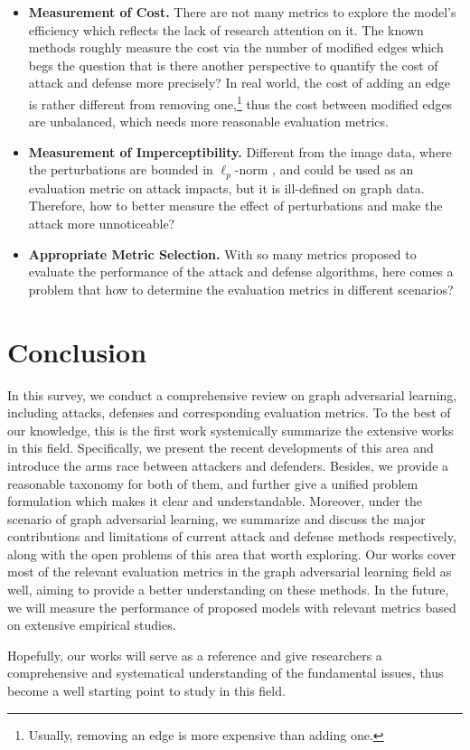 \begin{itemize}
	\item \textbf{Measurement of Cost.} There are not many metrics to explore the model's efficiency which reflects the lack of research attention on it. The known methods roughly measure the cost via the number of modified edges which begs the question that is there another perspective to quantify the cost of attack and defense more precisely? In real world, the cost of adding an edge is rather different from removing one,\footnote{Usually, removing an edge is more expensive than adding one.} thus the cost between modified edges are unbalanced, which needs more reasonable evaluation metrics.

	\item \textbf{Measurement of Imperceptibility.} Different from the image data, where the perturbations are bounded in $\ell_p$-norm \cite{sun2018adversarial,goodfellow2014explaining,madry2017towards}, and could be used as an evaluation metric on attack impacts, but it is ill-defined on graph data. Therefore, how to better measure the effect of perturbations and make the attack more unnoticeable?
	\item \textbf{Appropriate Metric Selection.} With so many metrics proposed to evaluate the performance of the attack and defense algorithms, here comes a problem that how to determine the evaluation metrics in different scenarios?
\end{itemize}


\section{Conclusion}
\label{conclusion}
In this survey, we conduct a comprehensive review on graph adversarial learning, including attacks, defenses and corresponding evaluation metrics. To the best of our knowledge, this is the first work systemically summarize the extensive works in this field. Specifically, we present the recent developments of this area and introduce the arms race between attackers and defenders. Besides, we provide a reasonable taxonomy for both of them, and further give a unified problem formulation which makes it clear and understandable. Moreover, under the scenario of graph adversarial learning, we summarize and discuss the major contributions and limitations of current attack and defense methods respectively, along with the open problems of this area that worth exploring. Our works cover most of the relevant evaluation metrics in the graph adversarial learning field as well, aiming to provide a better understanding on these methods. In the future, we will measure the performance of proposed models with relevant metrics based on extensive empirical studies.

Hopefully, our works will serve as a reference and give researchers a comprehensive and systematical understanding of the fundamental issues, thus become a well starting point to study in this field.

